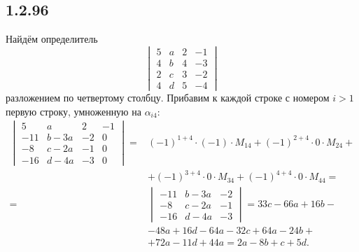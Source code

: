 \subsection{1.2.96}

Найдём определитель
\[
\begin{vmatrix}
	5 & a & 2 & -1 \\
	4 & b & 4 & -3 \\
	2 & c & 3 & -2 \\
	4 & d & 5 & -4
\end{vmatrix}
\]
разложением по четвертому столбцу. Прибавим к каждой строке с номером $i>1$ первую строку, умноженную на $\alpha_{i4}$:
\[
\begin{split}
	\begin{vmatrix}
	5 & a & 2 & -1 \\
	-11 & b-3a & -2 & 0 \\
	-8 & c-2a & -1 & 0 \\
	-16 & d-4a & -3 & 0
	\end{vmatrix}
	= & (-1)^{1+4}\cdot (-1)\cdot M_{14}+(-1)^{2+4}\cdot0\cdot M_{24}+ \\
	& +(-1)^{3+4}\cdot0\cdot M_{34}+(-1)^{4+4}\cdot0\cdot M_{44}= \\
	= &
	\begin{vmatrix}
	-11 & b-3a & -2 \\
	-8 & c-2a & -1 \\
	-16 & d-4a & -3
	\end{vmatrix}
	=33c-66a+16b- \\
	& -48a+16d-64a-32c+64a-24b+ \\
	& +72a-11d+44a=2a-8b+c+5d.
\end{split}
\]